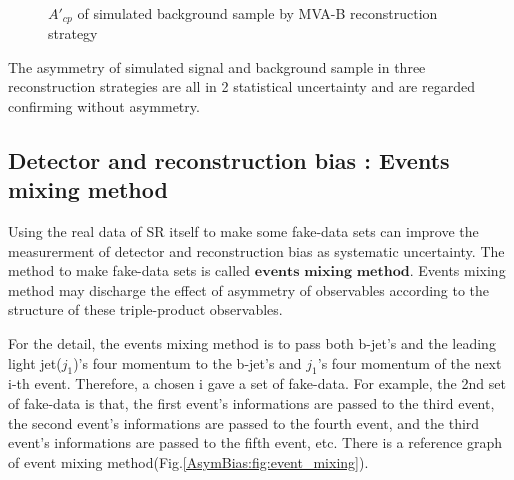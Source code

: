 		\begin{figure}[H]
			\centering
				\\
		\caption{$A'_{cp}$ of simulated background sample by MVA-B reconstruction strategy}
		\label{AsymBias:fig:a05_noMlbcut_sim_bkg_A'cp}
		\end{figure}
		\FloatBarrier

		The asymmetry of simulated signal and background sample in three reconstruction strategies are all in 2 statistical uncertainty and are regarded confirming without asymmetry.

	\subsection{Detector and reconstruction bias : Events mixing method}
	\label{ssec:evts_mixing}

		Using the real data of SR itself to make some fake-data sets can improve the measurerment of detector and reconstruction bias as systematic uncertainty. The method to make fake-data sets is called $\textbf{events mixing method}$. Events mixing method may discharge the effect of asymmetry of observables according to the structure of these triple-product observables.

		For the detail, the events mixing method is to pass both b-jet's and the leading light jet($j_1$)'s four momentum to the b-jet's and $j_1$'s four momentum of the next i-th event. Therefore, a chosen i gave a set of fake-data. For example, the 2nd set of fake-data is that, the first event's informations are passed to the third event, the second event's informations are passed to the fourth event, and the third event's informations are passed to the fifth event, etc. There is a reference graph of event mixing method(Fig.\ref{AsymBias:fig:event_mixing}).

